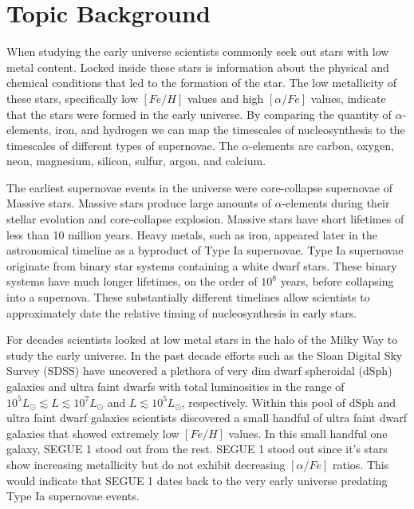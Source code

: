 
\section{Topic Background}
When studying the early universe scientists commonly seek out stars with low metal content. Locked inside these stars
is information about the physical and chemical conditions that led to the formation of the star. The low metallicity of
these stars, specifically low $\left[ Fe / H \right]$ values and high $\left[ \alpha / Fe \right]$ values, indicate that
the stars were formed in the early universe. By comparing the quantity of $\alpha$-elements, iron, and hydrogen we can map the
timescales of nucleosynthesis to the timescales of different types of supernovae. The $\alpha$-elements are carbon, oxygen, neon,
magnesium, silicon, sulfur, argon, and calcium.

The earliest supernovae events in the universe were core-collapse supernovae of Massive stars. Massive stars produce large
amounts of $\alpha$-elements during their stellar evolution and core-collapse explosion. Massive stars have short lifetimes
of less than 10 million years. Heavy metals, such as iron, appeared later in the astronomical timeline as a byproduct of Type Ia
supernovae. Type Ia supernovae originate from binary star systems containing a white dwarf stars. These binary systems have much
longer lifetimes, on the order of $10^8$ years, before collapsing into a supernova. These substantially different timelines allow
scientists to approximately date the relative timing of nucleosynthesis in early stars.

For decades scientists looked at low metal stars in the halo of the Milky Way to study the early universe. In the past decade efforts
such as the Sloan Digital Sky Survey (SDSS) have uncovered a plethora of very dim dwarf spheroidal (dSph) galaxies and ultra faint dwarfs
with total luminosities in the range of \(10^{5} L_{\odot} \lesssim L \lesssim 10^{7} L_{\odot}\) and \(L \lesssim 10^5 L_{\odot}\),
respectively. Within this pool of dSph and ultra faint dwarf galaxies scientists discovered a small handful of ultra faint dwarf galaxies
that showed extremely low $\left[ Fe / H \right]$ values. In this small handful one galaxy, SEGUE 1 stood out from the rest.
SEGUE 1 stood out since it's stars show increasing metallicity but do not exhibit decreasing $\left[\alpha / Fe\right]$ ratios.
This would indicate that SEGUE 1 dates back to the very early universe predating Type Ia supernovae events.

